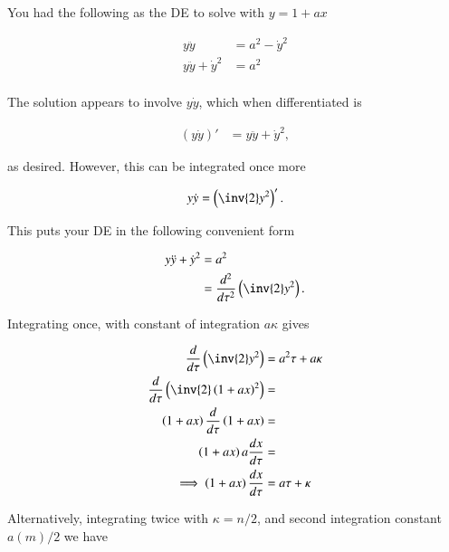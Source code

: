 \documentclass{article}      %
\begin{document}

%
%

You had the following as the DE to solve with $y = 1 + ax$

\begin{align*}
y\ddot{y} &= a^2 - \dot{y}^2 \\
y\ddot{y} + \dot{y}^2 &= a^2 \\
\end{align*}

The solution appears to involve $y\dot{y}$, which when differentiated
is

\begin{align*}
(y\dot{y})' &= y \ddot{y} + \dot{y}^2,
\end{align*}

as desired.  However, this can be integrated once more

\begin{align*}
y\dot{y} = \left(\inv{2} y^2\right)'.
\end{align*}

This puts your DE in the following convenient form

\begin{align*}
y\ddot{y} + \dot{y}^2 &= a^2 \\
&= \frac{d^2}{d\tau^2}\left(\inv{2} y^2\right).
\end{align*}

Integrating once, with constant of integration $a \kappa$ gives

\begin{align*}
\frac{d}{d\tau}\left(\inv{2} y^2\right) &= a^2 \tau + a \kappa \\
\frac{d}{d\tau}\left(\inv{2} \left(1+ax\right)^2\right) &=  \\
\left(1+ax\right)\frac{d}{d\tau}\left(1+ax\right) &=  \\
\left(1+ax\right)a\frac{dx}{d\tau} &=  \\
\implies
\left(1+ax\right)\frac{dx}{d\tau} &= a\tau + \kappa \\
\end{align*}

Alternatively, integrating twice with $\kappa = n/2$, and second integration constant $a (m)/2$ we have
\end{document}
